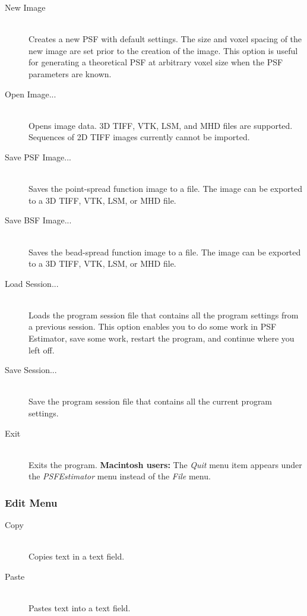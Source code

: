 \documentclass[11pt,titlepage,twoside]{article}
\begin{document}
\begin{description}
  \item[New Image] \hfill \\
  Creates a new PSF with default settings. The size and voxel spacing of the new image are set prior to the creation of the image. This option is useful for generating a theoretical PSF at arbitrary voxel size when the PSF parameters are known.

  \item[Open Image...] \hfill \\
  Opens image data. 3D TIFF, VTK, LSM, and MHD files are supported. Sequences of 2D TIFF images currently cannot be imported.

  \item[Save PSF Image...] \hfill \\
   Saves the point-spread function image to a file. The image can be exported to a 3D TIFF, VTK, LSM, or MHD file.
   
  \item[Save BSF Image...] \hfill \\
  Saves the bead-spread function image to a file. The image can be exported to a 3D TIFF, VTK, LSM, or MHD file.
  
  \item[Load Session...] \hfill \\
  Loads the program session file that contains all the program settings from a previous session. This option enables you to do some work in PSF Estimator, save some work, restart the program, and continue where you left off.
  
  \item[Save Session...] \hfill \\
  Save the program session file that contains all the current program settings.
  
  \item[Exit] \hfill \\
  Exits the program. \textbf{Macintosh users:} The \emph{Quit} menu item appears under the \emph{PSFEstimator} menu instead of the \emph{File} menu.

\end{description}
\subsubsection{Edit Menu}

\begin{description}

  \item[Copy] \hfill \\
  Copies text in a text field.
  
  \item[Paste] \hfill \\
  Pastes text into a text field.
  
\end{description}
\end{document}
